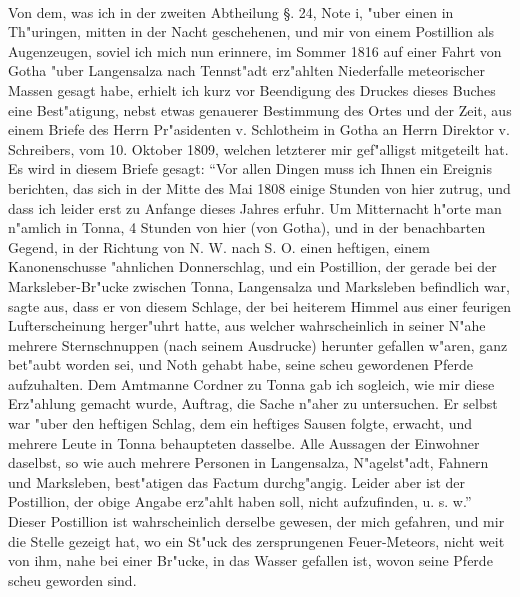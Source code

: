 \documentclass[a4paper, 11pt, oneside, polutonikogreek, german]{article}
\begin{document}
\paragraph{}
Von dem, was ich in der zweiten Abtheilung §. 24, Note i, "uber einen in Th"uringen, mitten in der Nacht geschehenen, und mir von einem Postillion als Augenzeugen, soviel ich mich nun erinnere, im Sommer 1816 auf einer Fahrt von Gotha "uber Langensalza nach Tennst"adt erz"ahlten Niederfalle meteorischer Massen gesagt habe, erhielt ich kurz vor Beendigung des Druckes dieses Buches eine Best"atigung, nebst etwas genauerer Bestimmung des Ortes und der Zeit, aus einem Briefe des Herrn Pr"asidenten v. Schlotheim in Gotha an Herrn Direktor v. Schreibers, vom 10. Oktober 1809, welchen letzterer mir gef"alligst mitgeteilt hat. Es wird in diesem Briefe gesagt: "`Vor allen Dingen muss ich Ihnen ein Ereignis berichten, das sich in der Mitte des Mai 1808 einige Stunden von hier zutrug, und dass ich leider erst zu Anfange dieses Jahres erfuhr. Um Mitternacht h"orte man n"amlich in Tonna, 4 Stunden von hier (von Gotha), und in der benachbarten Gegend, in der Richtung von N. W. nach S. O. einen heftigen, einem Kanonenschusse "ahnlichen Donnerschlag, und ein Postillion, der gerade bei der Marksleber-Br"ucke zwischen Tonna, Langensalza und Marksleben befindlich war, sagte aus, dass er von diesem Schlage, der bei heiterem Himmel aus einer feurigen Lufterscheinung herger"uhrt hatte, aus welcher wahrscheinlich in seiner N"ahe mehrere Sternschnuppen (nach seinem Ausdrucke) herunter gefallen w"aren, ganz bet"aubt worden sei, und Noth gehabt habe, seine scheu gewordenen Pferde aufzuhalten. Dem Amtmanne Cordner zu Tonna gab ich sogleich, wie mir diese Erz"ahlung gemacht wurde, Auftrag, die Sache n"aher zu untersuchen. Er selbst war "uber den heftigen Schlag, dem ein heftiges Sausen folgte, erwacht, und mehrere Leute in Tonna behaupteten dasselbe. Alle Aussagen der Einwohner daselbst, so wie auch mehrere Personen in Langensalza, N"agelst"adt, Fahnern und Marksleben, best"atigen das Factum durchg"angig. Leider aber ist der Postillion, der obige Angabe erz"ahlt haben soll, nicht aufzufinden, u. s. w."' Dieser Postillion ist wahrscheinlich derselbe gewesen, der mich gefahren, und mir die Stelle gezeigt hat, wo ein St"uck des zersprungenen Feuer-Meteors, nicht weit von ihm, nahe bei einer Br"ucke, in das Wasser gefallen ist, wovon seine Pferde scheu geworden sind.
\clearpage
\section{}
\end{document}
